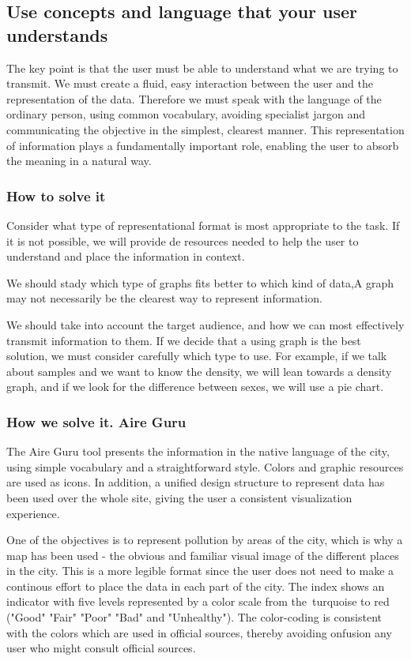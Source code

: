 \subsection{Use concepts and language that your user understands}
The key point is that the user must be able to understand what we are trying to transmit. We must create a fluid, 
easy interaction between the user and the representation of the data. Therefore we must speak with the language of 
the ordinary person, using common vocabulary, avoiding specialist jargon and communicating the objective in the simplest, 
clearest manner. This representation of information plays a fundamentally important role, enabling the user to absorb 
the meaning in a natural way.

\subsubsection*{How to solve it} 
Consider what type of representational format is most appropriate to the task. If it is not possible, we will provide de 
resources needed to help the user to understand and place the information in context. 

We should stady which type of graphs fits better to which kind of data,A graph may not necessarily be the 
clearest way to represent information.

We should take into account the target audience, and how we can most effectively transmit information to them. 
If we decide that a using graph is the best solution, we must consider carefully which type to use. For example, 
if we talk about samples and we want to know the density, we will lean towards a density graph, and if we look for the difference
between sexes, we will use a pie chart.

\subsubsection*{How we solve it. Aire Guru} 
The Aire Guru tool presents the information in the native language of the city, using simple vocabulary and a 
straightforward style.
Colors and graphic resources are used as icons. In addition, a unified design structure to represent data has 
been used over the whole site, giving the user a consistent visualization experience. 

One of the objectives is to represent pollution by areas of the city, which is why a map has been used - the 
obvious and familiar visual image of the different places in the city. This is a more legible format since the user
does not need to make a continous effort to place the data in each part of the city. The index shows an indicator with 
five levels represented by a color scale from the turquoise to red ("Good" "Fair" "Poor" "Bad" and "Unhealthy"). 
The color-coding is consistent with the colors which are used in official sources, thereby avoiding onfusion any 
user who might consult official sources.

